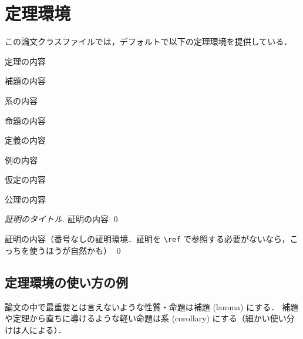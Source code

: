 \documentclass[sharedthmnum]{sumiilab-paper}
\begin{document}
\section{定理環境}

この論文クラスファイルでは，デフォルトで以下の定理環境を提供している．

\begin{theorem}[定理のタイトル]
  定理の内容
\end{theorem}

\begin{lemma}[補題のタイトル]
  補題の内容
\end{lemma}

\begin{corollary}[系のタイトル]
  系の内容
\end{corollary}

\begin{proposition}[命題のタイトル]
  命題の内容
\end{proposition}

\begin{definition}[定義のタイトル]
  定義の内容
\end{definition}

\begin{example}[例のタイトル]
  例の内容
\end{example}

\begin{assumption}[仮定のタイトル]
  仮定の内容
\end{assumption}

\begin{axiom}[公理のタイトル]
  公理の内容
\end{axiom}

\begin{proof}[証明のタイトル]
  証明の内容 \qed
\end{proof}

\begin{proof*}[証明のタイトル]
  証明の内容（番号なしの証明環境．証明を \lstinline|\ref| で参照する必要がないなら，こっちを使うほうが自然かも） \qed
\end{proof*}

\subsection{定理環境の使い方の例}

\begin{lemma}
  \label{lem:interesting-lemma}
  論文の中で最重要とは言えないような性質・命題は補題 (lamma) にする．
  補題や定理から直ちに導けるような軽い命題は系 (corollary) にする（細かい使い分けは人による）．
\end{lemma}
\end{document}
